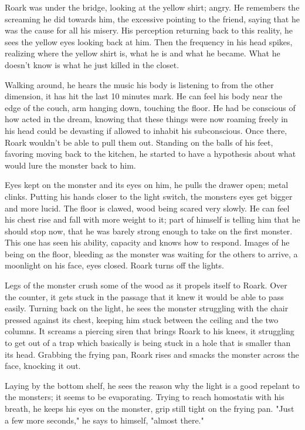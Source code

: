         Roark was under the bridge, looking at the yellow shirt; angry. He remembers the screaming he did towards him, the excessive pointing
    to the friend, saying that he was the cause for all his misery. His perception returning back to this reality, he sees the yellow eyes
    looking back at him. Then the frequency in his head spikes, realizing where the yellow shirt is, what he is and what he became. What he 
    doesn't know is what he just killed in the closet.

        Walking around, he hears the music his body is listening to from the other dimension, it has hit the last 10 minutes mark. He can
    feel his body near the edge of the couch, arm hanging down, touching the floor. He had be conscious of how acted in the dream, knowing 
    that these things were now roaming freely in his head could be devasting if allowed to inhabit his subconscious. Once there, Roark
    wouldn't be able to pull them out. Standing on the balls of his feet, favoring moving back to the kitchen, he started to have a hypothesis
    about what would lure the monster back to him.

        Eyes kept on the monster and its eyes on him, he pulls the drawer open; metal clinks. Putting his hands closer to the light switch, the
    monsters eyes get bigger and more lucid. The floor is clawed, wood being scared very slowly. He can feel his chest rise and fall with
    more weight to it; part of himself is telling him that he should stop now, that he was barely strong enough to take on the first monster.
    This one has seen his ability, capacity and knows how to respond. Images of he being on the floor, bleeding as the monster was waiting for
    the others to arrive, a moonlight on his face, eyes closed. Roark turns off the lights.

        Legs of the monster crush some of the wood as it propels itself to Roark. Over the counter, it gets stuck in the passage that it knew
    it would be able to pass easily. Turning back on the light, he sees the monster struggling with the chair pressed against its chest, keeping
    him stuck between the ceiling and the two columns. It screams a piercing siren that brings Roark to his knees, it struggling to get out of
    a trap which basically is being stuck in a hole that is smaller than its head. Grabbing the frying pan, Roark rises and smacks the monster
    across the face, knocking it out.

        Laying by the bottom shelf, he sees the reason why the light is a good repelant to the monsters; it seems to be evaporating. Trying
    to reach homostatis with his breath, he keeps his eyes on the monster, grip still tight on the frying pan. "Just a few more seconds," he
    says to himself, "almost there."

